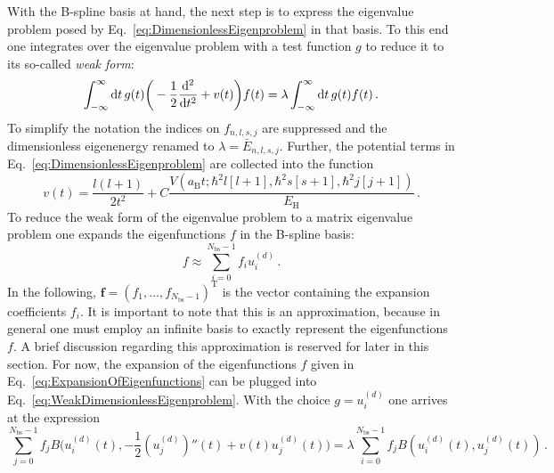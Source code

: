 \documentclass[fontsize=12pt,
               twoside=false,
               BCOR=0mm,
               DIV=14,
               overfullrule=false, %
               toc=bibliography,
               headinclude=true,
               footinclude=false]{scrartcl}
\numberwithin{equation}{section}
\newcommand{\aB}{a_\mathrm{B}}
\newcommand{\EH}{E_\mathrm{H}}
\begin{document}
    With the B-spline basis at hand, the next step is to express the eigenvalue
    problem posed by Eq.~\eqref{eq:DimensionlessEigenproblem} in that basis. To
    this end one integrates over the eigenvalue problem with a test function $g$
    to reduce it to its so-called \emph{weak form}:
    \begin{equation}\label{eq:WeakDimensionlessEigenproblem}
        \int^\infty_{-\infty} \dd{t}
        g(t) \bigg(-\frac{1}{2}\dv[2]{t} + v(t)\bigg) f(t)
        =
        \lambda
        \int^\infty_{-\infty} \dd{t}
        g(t) f(t)
    \,.
    \end{equation}
    To simplify the notation the indices on $f_{n,l,s,j}$ are suppressed and the
    dimensionless eigenenergy renamed to $\lambda=\bar{E}_{n,l,s,j}$. Further,
    the potential terms in Eq.~\eqref{eq:DimensionlessEigenproblem} are
    collected into the function
    \begin{equation}\label{eq:EffectivePotential}
        v(t)
        =
        \frac{l(l+1)}{2t^2}
        +
        C\frac{V(\aB{t};\hbar^2l[l+1],\hbar^2s[s+1],\hbar^2j[j+1])}{\EH}
    \,.
    \end{equation}
    To reduce the weak form of the eigenvalue problem to a matrix eigenvalue
    problem one expands the eigenfunctions $f$ in the B-spline basis:
    \begin{equation}\label{eq:ExpansionOfEigenfunctions}
        f
        \approx
        \sum^{N_\mathrm{bs}-1}_{i=0}
        f_i u^{(d)}_i
    \,.
    \end{equation}
    In the following, $\bm{f}=(f_1,\dots,f_{N_\mathrm{bs}-1})^\mathrm{T}$ is the
    vector containing the expansion coefficients $f_i$. It is important to note
    that this is an approximation, because in general one must employ an
    infinite basis to exactly represent the eigenfunctions $f$. A brief
    discussion regarding this approximation is reserved for later in this
    section. For now, the expansion of the eigenfunctions $f$ given in
    Eq.~\eqref{eq:ExpansionOfEigenfunctions} can be plugged into
    Eq.~\eqref{eq:WeakDimensionlessEigenproblem}. With the choice $g=u^{(d)}_i$
    one arrives at the expression
    \begin{equation}\label{eq:WeakEigenvalueProblemStepI}
        \sum^{N_\mathrm{bs}-1}_{j=0}
        f_j
        B\bigg(
            u^{(d)}_i(t),
            -\frac{1}{2}(u^{(d)}_j)''(t)+v(t)u^{(d)}_j(t)
        \bigg)
        =
        \lambda
        \sum^{N_\mathrm{bs}-1}_{i=0}
        f_j
        B(u^{(d)}_i(t), u^{(d)}_j(t))
    \,.
    \end{equation}
\end{document}

